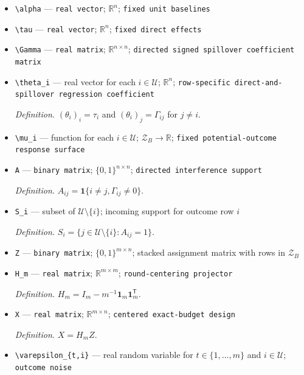 \documentclass{article}
\begin{document}
\begin{itemize}
  \item \texttt{\textbackslash{}\allowbreak{}alpha} --- \texttt{real vector}; \(\mathbb R^n\); \texttt{fixed unit baselines}
  \item \texttt{\textbackslash{}\allowbreak{}tau} --- \texttt{real vector}; \(\mathbb R^n\); \texttt{fixed direct effects}
  \item \texttt{\textbackslash{}\allowbreak{}Gamma} --- \texttt{real matrix}; \(\mathbb R^{n\times n}\); \texttt{directed signed spillover coefficient matrix}
  \item \texttt{\textbackslash{}\allowbreak{}theta\_\allowbreak{}i} --- real vector for each \(i\in\mathcal U\); \(\mathbb R^n\); \texttt{row-\allowbreak{}specific direct-\allowbreak{}and-\allowbreak{}spillover regression coefficient}
  \par\smallskip\noindent\emph{Definition.} \((\theta_i)_i=\tau_i\) and \((\theta_i)_j=\Gamma_{ij}\) for \(j\ne i\).
  \item \texttt{\textbackslash{}\allowbreak{}mu\_\allowbreak{}i} --- function for each \(i\in\mathcal U\); \(\mathcal Z_B\to\mathbb R\); \texttt{fixed potential-\allowbreak{}outcome response surface}
  \item \texttt{A} --- \texttt{binary matrix}; \(\{0,1\}^{n\times n}\); \texttt{directed interference support}
  \par\smallskip\noindent\emph{Definition.} \(A_{ij}=\mathbf 1\{i\ne j,\Gamma_{ij}\ne0\}\).
  \item \texttt{S\_\allowbreak{}i} --- subset of \(\mathcal U\setminus\{i\}\); incoming support for outcome row \(i\)
  \par\smallskip\noindent\emph{Definition.} \(S_i=\{j\in\mathcal U\setminus\{i\}:A_{ij}=1\}\).
  \item \texttt{Z} --- \texttt{binary matrix}; \(\{0,1\}^{m\times n}\); stacked assignment matrix with rows in \(\mathcal Z_B\)
  \item \texttt{H\_\allowbreak{}m} --- \texttt{real matrix}; \(\mathbb R^{m\times m}\); \texttt{round-\allowbreak{}centering projector}
  \par\smallskip\noindent\emph{Definition.} \(H_m=I_m-m^{-1}\mathbf 1_m\mathbf 1_m^{\mathsf T}\).
  \item \texttt{X} --- \texttt{real matrix}; \(\mathbb R^{m\times n}\); \texttt{centered exact-\allowbreak{}budget design}
  \par\smallskip\noindent\emph{Definition.} \(X=H_mZ\).
  \item \texttt{\textbackslash{}\allowbreak{}varepsilon\_\allowbreak{}\{t,\allowbreak{}i\}\allowbreak{}} --- real random variable for \(t\in\{1,\ldots,m\}\) and \(i\in\mathcal U\); \texttt{outcome noise}

\end{itemize}
\end{document}
